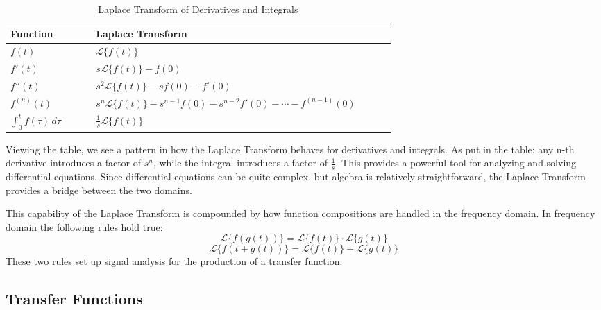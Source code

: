 \documentclass[journal]{IEEEtran}
\begin{document}
\begin{table}[H]
\centering
\caption{Laplace Transform of Derivatives and Integrals}
\label{tab:symbol_definitions}
\renewcommand{\arraystretch}{1.1}
\begin{tabular}{
    >{\raggedright\arraybackslash}p{0.20\linewidth}
    >{\raggedright\arraybackslash}p{0.70\linewidth}
}
\toprule
Function & Laplace Transform \\
\midrule
$f(t)$ & $\mathcal{L}\{f(t)\}$ \\
$f'(t)$ & $s\mathcal{L}\{f(t)\} - f(0)$ \\
$f''(t)$ & $s^2\mathcal{L}\{f(t)\} - sf(0) - f'(0)$ \\
$f^{(n)}(t)$ & $s^n\mathcal{L}\{f(t)\} - s^{n-1}f(0) - s^{n-2}f'(0) - \cdots - f^{(n-1)}(0)$ \\
$\int_0^t f(\tau)\,d\tau$ & $\frac{1}{s}\mathcal{L}\{f(t)\}$ \\
\bottomrule
\end{tabular}
\end{table}
Viewing the table, we see a pattern in how the Laplace Transform 
behaves for derivatives and integrals. As put in the table: any n-th derivative introduces 
a factor of $s^n$, while the integral introduces a factor of $\frac{1}{s}$. 
This provides a powerful tool for analyzing and solving differential equations. 
Since differential equations can be quite complex, but algebra is 
relatively straightforward, the Laplace Transform provides a bridge between the two domains. 

This capability of the Laplace Transform is compounded by how function compositions 
are handled in the frequency domain. 
In frequency domain the following rules hold true:
\begin{equation}
\mathcal{L}\{f(g(t))\} = \mathcal{L}\{f(t)\} \cdot \mathcal{L}\{g(t)\}
\end{equation}
\begin{equation}
\mathcal{L}\{f(t+g(t))\} = \mathcal{L}\{f(t)\} + \mathcal{L}\{g(t)\}
\end{equation}
These two rules set up signal analysis for the production of a transfer function.

\subsection{Transfer Functions}
\end{document}
